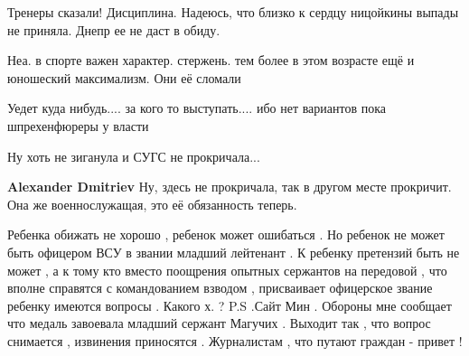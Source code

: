 \begin{itemize}
Тренеры сказали! Дисциплина. Надеюсь, что близко к сердцу ницойкины выпады не приняла. Днепр ее не даст в обиду.

 
Неа. в спорте важен характер. стержень. тем более в этом возрасте ещё и юношеский максимализм. Они её сломали

 
Уедет куда нибудь.... за кого то выступать.... ибо нет вариантов пока шпрехенфюреры у власти

 
Ну хоть не зиганула и СУГС не прокричала...

\begin{itemize}
 
\textbf{Alexander Dmitriev} Ну, здесь не прокричала, так в другом месте прокричит. Она же военнослужащая, это её обязанность теперь.
\end{itemize}


Ребенка обижать не хорошо , ребенок может ошибаться . Но ребенок не может быть
офицером ВСУ в звании младший лейтенант . К ребенку претензий быть не может , а
к тому кто вместо поощрения опытных сержантов на передовой , что вполне
справятся с командованием взводом , присваивает офицерское звание ребенку
имеются вопросы . Какого х. ? P.S .Сайт Мин . Обороны мне сообщает что медаль
завоевала младший сержант Магучих . Выходит так , что вопрос снимается ,
извинения приносятся . Журналистам , что путают граждан - привет !


\end{itemize}
